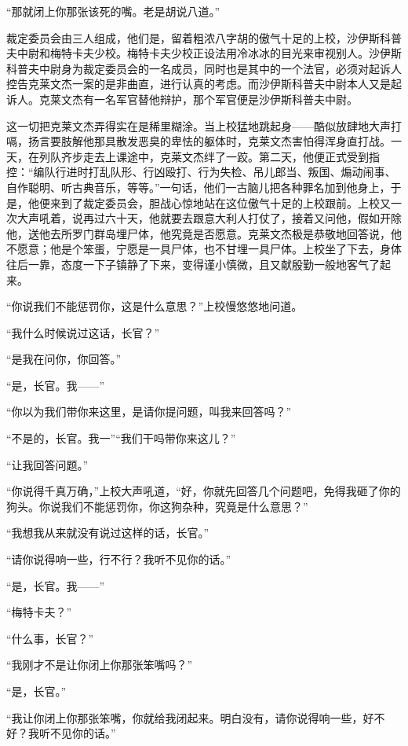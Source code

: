     “那就闭上你那张该死的嘴。老是胡说八道。”

    裁定委员会由三人组成，他们是，留着粗浓八字胡的傲气十足的上校，沙伊斯科普夫中尉和梅特卡夫少校。梅特卡夫少校正设法用冷冰冰的目光来审视别人。沙伊斯科普夫中尉身为裁定委员会的一名成员，同时也是其中的一个法官，必须对起诉人控告克莱文杰一案的是非曲直，进行认真的考虑。而沙伊斯科普夫中尉本人又是起诉人。克莱文杰有一名军官替他辩护，那个军官便是沙伊斯科普夫中尉。

    这一切把克莱文杰弄得实在是稀里糊涂。当上校猛地跳起身——酷似放肆地大声打嗝，扬言要肢解他那具散发恶臭的卑怯的躯体时，克莱文杰害怕得浑身直打战。一天，在列队齐步走去上课途中，克莱文杰绊了一跤。第二天，他便正式受到指控：“编队行进时打乱队形、行凶殴打、行为失检、吊儿郎当、叛国、煽动闹事、自作聪明、听古典音乐，等等。”一句话，他们一古脑儿把各种罪名加到他身上，于是，他便来到了裁定委员会，胆战心惊地站在这位傲气十足的上校跟前。上校又一次大声吼着，说再过六十天，他就要去跟意大利人打仗了，接着又问他，假如开除他，送他去所罗门群岛埋尸体，他究竟是否愿意。克莱文杰极是恭敬地回答说，他不愿意；他是个笨蛋，宁愿是一具尸体，也不甘埋一具尸体。上校坐了下去，身体往后一靠，态度一下子镇静了下来，变得谨小慎微，且又献殷勤一般地客气了起来。

    “你说我们不能惩罚你，这是什么意思？”上校慢悠悠地问道。

    “我什么时候说过这话，长官？”

    “是我在问你，你回答。”

    “是，长官。我——”

    “你以为我们带你来这里，是请你提问题，叫我来回答吗？”

    “不是的，长官。我一”“我们干吗带你来这儿？”

    “让我回答问题。”

    “你说得千真万确，”上校大声吼道，“好，你就先回答几个问题吧，免得我砸了你的狗头。你说我们不能惩罚你，你这狗杂种，究竟是什么意思？”

    “我想我从来就没有说过这样的话，长官。”

    “请你说得响一些，行不行？我听不见你的话。”

    “是，长官。我——”

    “梅特卡夫？”

    “什么事，长官？”

    “我刚才不是让你闭上你那张笨嘴吗？”

    “是，长官。”

    “我让你闭上你那张笨嘴，你就给我闭起来。明白没有，请你说得响一些，好不好？我听不见你的话。”

